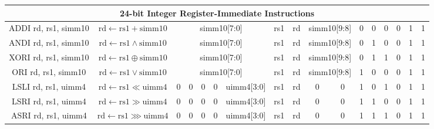 \documentclass[a4paper,10pt]{article}
\begin{document}
\begin{landscape}
\begin{longtable}[c]{|c|c|@{}c@{}|@{}c@{}|@{}c@{}|@{}c@{}|@{}c@{}|@{}c@{}|@{}c@{}|@{}c@{}|@{}c@{}|@{}c@{}|@{}c@{}|@{}c@{}|@{}c@{}|@{}c@{}|@{}c@{}|@{}c@{}|@{}c@{}|@{}c@{}|@{}c@{}|@{}c@{}|@{}c@{}|@{}c@{}|@{}c@{}|@{}c@{}|}
\hline
\multicolumn{26}{|c|}{24-bit Integer Register-Immediate Instructions}                                                                                                                                                                                                                                                             \\\hline
ADDI rd, rs1, simm10  & $\mathrm{rd} \leftarrow \mathrm{rs1} + \mathrm{simm10}$ & \multicolumn{8}{c|}{simm10{[}7:0{]}}                        & \multicolumn{4}{c|}{rs1}            & \multicolumn{4}{c|}{rd}      & \multicolumn{2}{c|}{simm10{[}9:8{]}} & 0   & 0   & 0   & 0 & 1 & 1 \\
ANDI rd, rs1, simm10  & $\mathrm{rd} \leftarrow \mathrm{rs1} \land \mathrm{simm10}$ & \multicolumn{8}{c|}{simm10{[}7:0{]}}                        & \multicolumn{4}{c|}{rs1}            & \multicolumn{4}{c|}{rd}      & \multicolumn{2}{c|}{simm10{[}9:8{]}} & 0   & 1   & 0   & 0 & 1 & 1 \\
XORI rd, rs1, simm10  & $\mathrm{rd} \leftarrow \mathrm{rs1} \oplus \mathrm{simm10}$ & \multicolumn{8}{c|}{simm10{[}7:0{]}}                        & \multicolumn{4}{c|}{rs1}            & \multicolumn{4}{c|}{rd}      & \multicolumn{2}{c|}{simm10{[}9:8{]}} & 0   & 1   & 1   & 0 & 1 & 1 \\
ORI rd, rs1, simm10   & $\mathrm{rd} \leftarrow \mathrm{rs1} \lor \mathrm{simm10}$ & \multicolumn{8}{c|}{simm10{[}7:0{]}}                        & \multicolumn{4}{c|}{rs1}            & \multicolumn{4}{c|}{rd}      & \multicolumn{2}{c|}{simm10{[}9:8{]}} & 1   & 0   & 0   & 0 & 1 & 1 \\
LSLI rd, rs1, uimm4   & $\mathrm{rd} \leftarrow \mathrm{rs1} \ll \mathrm{uimm4}$ & 0 & 0 & 0 & 0 & \multicolumn{4}{c|}{uimm4{[}3:0{]}} & \multicolumn{4}{c|}{rs1}            & \multicolumn{4}{c|}{rd}      & 0              & 0              & 1   & 0   & 1   & 0 & 1 & 1 \\
LSRI rd, rs1, uimm4   & $\mathrm{rd} \leftarrow \mathrm{rs1} \gg \mathrm{uimm4}$ & 0 & 0 & 0 & 0 & \multicolumn{4}{c|}{uimm4{[}3:0{]}} & \multicolumn{4}{c|}{rs1}            & \multicolumn{4}{c|}{rd}      & 0              & 0              & 1   & 1   & 0   & 0 & 1 & 1 \\
ASRI rd, rs1, uimm4   & $\mathrm{rd} \leftarrow \mathrm{rs1} \ggg \mathrm{uimm4}$ & 0 & 0 & 0 & 0 & \multicolumn{4}{c|}{uimm4{[}3:0{]}} & \multicolumn{4}{c|}{rs1}            & \multicolumn{4}{c|}{rd}      & 0              & 0              & 1   & 1   & 1   & 0 & 1 & 1 \\


\end{longtable}
\end{landscape}
\end{document}
